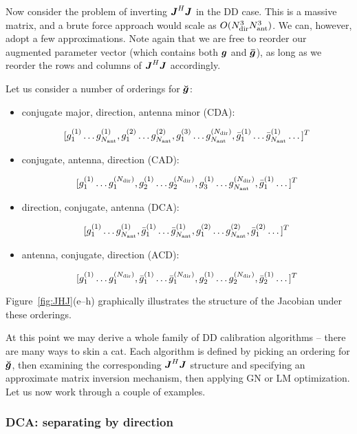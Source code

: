 \documentclass[useAMS,usenatbib]{mn2e}
\newcommand{\mat}[1]{{\bmath{#1}}}
\newcommand{\JJ}{\mat{J}} %
\newcommand{\JHJ}{\JJ^H\JJ} %
\newcommand{\AUG}[1]{\bmath{\breve{#1}}}
\newcommand{\Gg}{\AUG{g}}
\begin{document}
Now consider the problem of inverting $\JHJ$ in the DD case. This is a massive matrix, and a brute force 
approach would scale as $O(N_\mathrm{dir}^3N_\mathrm{ant}^3)$. We can, however, adopt a few approximations. Note again that we are 
free to reorder our augmented parameter vector (which contains both $\bmath{g}$ and $\bmath{\bar g}$), 
as long as we reorder the rows and columns of $\JHJ$ accordingly.

Let us consider a number of orderings for $\Gg$:

\begin{itemize}
\item conjugate major, direction, antenna minor (CDA):

\[
[g^{(1)}_1 \dots g^{(1)}_{N_\mathrm{ant}}, g^{(2)}_1 \dots g^{(2)}_{N_\mathrm{ant}}, g^{(3)}_1 \dots g^{(N_\mathrm{dir})}_{N_\mathrm{ant}}, 
 \bar{g}^{(1)}_1 \dots \bar{g}^{(1)}_{N_\mathrm{ant}} \dots ]^T
\]

\item conjugate, antenna, direction (CAD):

\[
[g^{(1)}_1 \dots g^{(N_\mathrm{dir})}_1, g^{(1)}_2 \dots g^{(N_\mathrm{dir})}_2, g^{(1)}_3 \dots g^{(N_\mathrm{dir})}_{N_\mathrm{ant}}, 
 \bar{g}^{(1)}_1 \dots ]^T
\]

\item direction, conjugate, antenna (DCA):

\[
[g^{(1)}_1 \dots g^{(1)}_{N_\mathrm{ant}},\bar{g}^{(1)}_1 \dots \bar{g}^{(1)}_{N_\mathrm{ant}},
g^{(2)}_1 \dots g^{(2)}_{N_\mathrm{ant}}, \bar{g}^{(2)}_1 \dots ]^T
\]

\item antenna, conjugate, direction (ACD):

\[
[g^{(1)}_1 \dots g^{(N_\mathrm{dir})}_1,\bar{g}^{(1)}_1 \dots \bar{g}^{(N_\mathrm{dir})}_1,
g^{(1)}_2 \dots g^{(N_\mathrm{dir})}_2, \bar{g}^{(1)}_2 \dots ]^T
\]

\end{itemize}

Figure~\ref{fig:JHJ}(e--h) graphically illustrates the structure of the Jacobian under these orderings.

At this point we may derive a whole family of DD calibration algorithms -- there are many ways to skin a cat. Each 
algorithm is defined by picking an ordering for $\Gg$, then examining the corresponding $\JHJ$ structure and specifying 
an approximate matrix inversion mechanism, then applying GN or LM optimization. Let us now work through a couple of examples.

\subsubsection{DCA: separating by direction}
\label{sec:dca}
\end{document}
